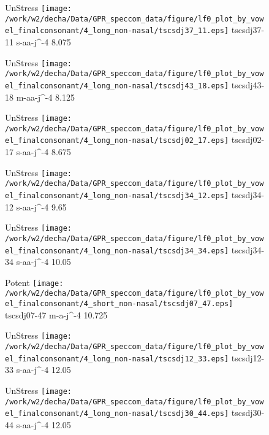 \documentclass{article}
\begin{document}
\begin{figure}[t]
\begin{minipage}[b]{.24\textwidth}
UnStress
\centering
\texttt{[image: /work/w2/decha/Data/GPR\_speccom\_data/figure/lf0\_plot\_by\_vowel\_finalconsonant/4\_long\_non-nasal/tscsdj37\_11.eps]}
tscsdj37-11 s-aa-j\textasciicircum-4 8.075
\end{minipage}
\begin{minipage}[b]{.24\textwidth}
UnStress
\centering
\texttt{[image: /work/w2/decha/Data/GPR\_speccom\_data/figure/lf0\_plot\_by\_vowel\_finalconsonant/4\_long\_non-nasal/tscsdj43\_18.eps]}
tscsdj43-18 m-aa-j\textasciicircum-4 8.125
\end{minipage}
\begin{minipage}[b]{.24\textwidth}
UnStress
\centering
\texttt{[image: /work/w2/decha/Data/GPR\_speccom\_data/figure/lf0\_plot\_by\_vowel\_finalconsonant/4\_long\_non-nasal/tscsdj02\_17.eps]}
tscsdj02-17 s-aa-j\textasciicircum-4 8.675
\end{minipage}
\begin{minipage}[b]{.24\textwidth}
UnStress
\centering
\texttt{[image: /work/w2/decha/Data/GPR\_speccom\_data/figure/lf0\_plot\_by\_vowel\_finalconsonant/4\_long\_non-nasal/tscsdj34\_12.eps]}
tscsdj34-12 s-aa-j\textasciicircum-4 9.65
\end{minipage}
\end{figure}

\begin{figure}[t]
\begin{minipage}[b]{.24\textwidth}
UnStress
\centering
\texttt{[image: /work/w2/decha/Data/GPR\_speccom\_data/figure/lf0\_plot\_by\_vowel\_finalconsonant/4\_long\_non-nasal/tscsdj34\_34.eps]}
tscsdj34-34 s-aa-j\textasciicircum-4 10.05
\end{minipage}
\begin{minipage}[b]{.24\textwidth}
\colorbox{Apricot}{Potent}
\centering
\texttt{[image: /work/w2/decha/Data/GPR\_speccom\_data/figure/lf0\_plot\_by\_vowel\_finalconsonant/4\_short\_non-nasal/tscsdj07\_47.eps]}
tscsdj07-47 m-a-j\textasciicircum-4 10.725
\end{minipage}
\begin{minipage}[b]{.24\textwidth}
UnStress
\centering
\texttt{[image: /work/w2/decha/Data/GPR\_speccom\_data/figure/lf0\_plot\_by\_vowel\_finalconsonant/4\_long\_non-nasal/tscsdj12\_33.eps]}
tscsdj12-33 s-aa-j\textasciicircum-4 12.05
\end{minipage}
\begin{minipage}[b]{.24\textwidth}
UnStress
\centering
\texttt{[image: /work/w2/decha/Data/GPR\_speccom\_data/figure/lf0\_plot\_by\_vowel\_finalconsonant/4\_long\_non-nasal/tscsdj30\_44.eps]}
tscsdj30-44 s-aa-j\textasciicircum-4 12.05
\end{minipage}
\end{figure}
\end{document}

